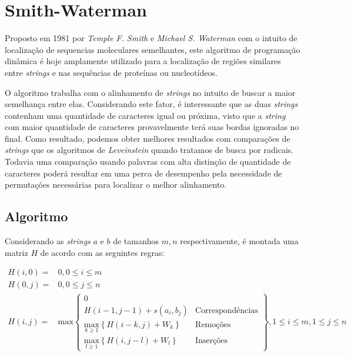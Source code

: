 \section{Smith-Waterman} %
\label{sec:smith_waterman}


Proposto em 1981 por \textit{Temple F. Smith} e \textit{Michael S. Waterman}\cite{smith1981identification} com o intuito de localização de sequencias moleculares semelhantes, este algoritmo de programação dinâmica é hoje amplamente utilizado para a localização de regiões similares entre \textit{strings} e nas sequências de proteínas ou nucleotídeos.

O algoritmo trabalha com o alinhamento de \textit{strings} no intuito de  buscar a maior semelhança entre elas. Considerando este fator, é interessante que as duas \textit{strings} contenham uma quantidade de caracteres igual ou próxima, visto que  a \textit{string} com  maior quantidade de caracteres provavelmente terá suas bordas ignoradas no final. Como resultado, podemos obter melhores resultados com comparações de \textit{strings} que os algoritmos de \textit{Leveinstein} quando tratamos de busca por radicais. Todavia uma comparação usando palavras com alta distinção de quantidade de caracteres poderá resultar em uma perca de desempenho pela necessidade de permutações necessárias para localizar o melhor alinhamento.

\subsection{Algoritmo} %
\label{sub:algoritmo}

Considerando as \textit{strings} $a$ e $b$ de tamanhos $m,n$ respectivamente, é montada uma matriz $H$ de acordo com as seguintes regras:

\begin{align*}
	H(i,0) =& 0, 0 \leq i \leq m \\
	H(0,j) =& 0, 0 \leq j \leq n \\
	H(i,j) =& \text{max}
	\begin{Bmatrix}
		0  &\\
		H(i-1,j-1) + s(a_i,b_j) & \text{Correspondências}\\
		\underset{k\geq1}{\text{max}} \left\{H(i-k,j) + W_k\right\} & \text{Remoções}\\
		\underset{l\geq1}{\text{max}} \left\{H(i,j-l) + W_l\right\} & \text{Inserções}
	\end{Bmatrix}, 1 \leq i \leq m, 1 \leq j \leq n
\end{align*}

